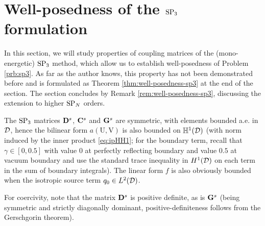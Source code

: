 

\section{Well-posedness of the $\SPN[3]$ formulation}\label{sec:sp3_wellposed}

In this section, we will study 
properties of coupling matrices of the (mono-energetic) $\SPN[3]$ method, which allow us to establish well-posedness
of Problem \ref{prb:sp3}. As far as the author knows, this property has not been demonstrated before and is
formulated as Theorem \ref{thm:well-posedness-sp3} at the end of the section. The section concludes by Remark
\ref{rem:well-posedness-sp3}, discussing the extension to higher $\SPN$ orders.

The $\SPN[3]$ matrices $\mat{D}^s$, $\mat{C}^s$ and $\mat{G}^s$ are symmetric, with elements bounded
a.e. in $\VV$, hence the bilinear form $a(\mathrm{U}, \mathrm{V})$ is also bounded on $\mathbb{H}^1(\VV)$ (with norm
induced by the inner product \eqref{eq:ipHH1}; for the boundary term,  recall that $\gamma \in [0,0.5]$ with value $0$ at perfectly 
reflecting boundary and value $0.5$ at vacuum boundary and use the standard trace inequality in
$H^1(\VV)$ on each term in the sum of boundary integrals). The linear form $f$ is also obviously bounded when the
isotropic source term $q_0 \in \Lp[2](\VV)$.

For coercivity, note that the matrix $\mat{D}^s$ is positive definite, as is $\mat{G}^s$ (being symmetric and strictly
diagonally dominant, positive-definiteness follows from the Gerschgorin theorem). 

